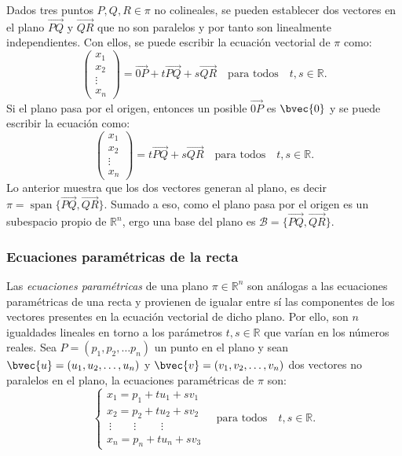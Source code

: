\documentclass{fmbnotes}
\begin{document}
Dados tres puntos \( P, Q, R \in \pi \) no colineales, se pueden establecer dos vectores en el plano \( \overrightarrow{P Q} \) y \( \overrightarrow{Q R} \) que no son paralelos y por tanto son linealmente independientes. Con ellos, se puede escribir la ecuación vectorial de \(\pi\) como: 
\[ \begin{pmatrix}
x_1 \\ x_2 \\ \vdots \\ x_n
\end{pmatrix}=\overrightarrow{0P} + t\overrightarrow{PQ} + s\overrightarrow{QR}\quad \text{para todos} \quad t,s \in \mathbb{R}.\]
Si el plano pasa por el origen, entonces
un posible \(\overrightarrow{0P}\) es \(\bvec{0}\) y se puede escribir la ecuación como:
\[ \begin{pmatrix}
x_1 \\ x_2 \\ \vdots \\ x_n
\end{pmatrix}=t\overrightarrow{PQ} + s\overrightarrow{QR}\quad \text{para todos} \quad t,s \in \mathbb{R}.\]
Lo anterior muestra que los dos vectores generan al plano, es decir \(\pi = \operatorname{span}\{\overrightarrow{P Q},\overrightarrow{Q R}\}\). Sumado a eso, como el plano pasa por el origen es un subespacio propio de \(\mathbb{R}^{n}\), ergo una base del plano es \(\mathcal{B}=\{\overrightarrow{P Q},\overrightarrow{Q R}\}\).

\subsubsection{Ecuaciones paramétricas de la recta}
Las \emph{ecuaciones paramétricas} de una plano \( \pi \in \mathbb{R}^{n} \) son análogas a las ecuaciones paramétricas de una recta y provienen de igualar entre sí las componentes de los vectores presentes en la ecuación vectorial de dicho plano. Por ello, son \( n \) igualdades lineales en torno a los parámetros \( t,s \in \mathbb{R} \) que varían en los números reales. Sea  \( P=\left(p_{1}, p_{2}, \ldots p_{n}\right) \) un punto en el plano y sean \( \bvec{u}=\left(u_{1}, u_{2}, \ldots, u_{n}\right)  \) y \( \bvec{v}=\left(v_{1}, v_{2}, \ldots, v_{n}\right) \) dos vectores no paralelos en el plano, la ecuaciones paramétricas de \(\pi\) son:
\[ \begin{cases}
x_{1}=p_{1}+t u_{1} + s v_1\\
x_{2}=p_{2}+t u_{2} + s v_2\\
\: \vdots \qquad \vdots \qquad \; \vdots \\
x_{n}=p_{n}+t u_{n} + s v_3
\end{cases} \quad \text{para todos} \quad t,s \in \mathbb{R}. \]
\end{document}
